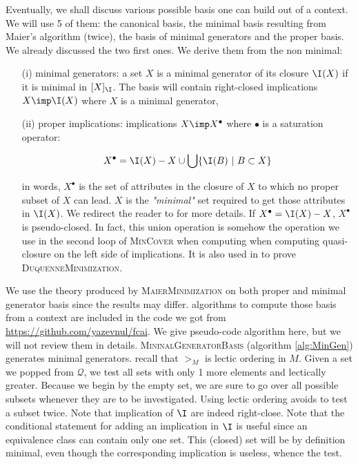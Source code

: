 Eventually, we shall discuss various possible basis one can build out of a context. We will use 5 of them: the canonical basis, the minimal basis resulting from Maier's algorithm (twice), the basis of minimal generators and the proper basis. We already discussed the two first ones. We derive them from the non minimal:
\begin{itemize}
	\item[(i)] minimal generators: a set $X$ is a minimal generator of its closure $\I(X)$ if it is minimal in $[ X]_{\I}$. The basis will contain
	right-closed implications $X \imp \I(X)$ where $X$ is a minimal generator,
	\item[(ii)] proper implications: implications $X \imp X^{\bullet}$ where 
	$\bullet$ is a saturation operator:
	
		\[ X^{\bullet} = \I(X) - X \cup \bigcup \{ \I(B) \ | \ B \subset X \} \]
		
	in words, $X^{\bullet}$ is the set of attributes in the closure of $X$ to
	which no proper subset of $X$ can lead. $X$ is the \textit{"minimal"} set required to get those attributes in $\I(X)$. We redirect the reader to 
	\cite{b._ganter_conceptual_2016} for more details. If $X^{\bullet} = \I(X) - X$, $X^{\bullet}$ is pseudo-closed. In fact, this union operation is somehow the operation we use in the second loop of \textsc{MinCover} when
	computing when computing quasi-closure on the left side of implications.
	It is also used in \cite{duquenne_variations_2007} to prove \textsc{DuquenneMinimization}.
\end{itemize}
\noindent We use the theory produced by \textsc{MaierMinimization} on both proper and minimal generator basis since the results may differ. algorithms to compute those basis from a context are included in the code we got from \url{https://github.com/yazevnul/fcai}. We give pseudo-code algorithm here, but we will not review them in details. \textsc{MininalGeneratorBasis} (algorithm \ref{alg:MinGen}) generates minimal 
generators. recall that $>_{M}$ is lectic ordering in $M$. Given a set we popped
from $\mathcal{Q}$, we test all sets with only 1 more elements and lectically
greater. Because we begin by the empty set, we are sure to go over all possible
subsets whenever they are to be investigated. Using lectic ordering avoids to
test a subset twice. Note that implication of $\I$ are indeed right-close.
Note that the conditional statement for adding an implication in $\I$ is useful
since an equivalence class can contain only one set. This (closed) set will
be by definition minimal, even though the corresponding implication is useless,
whence the test.

